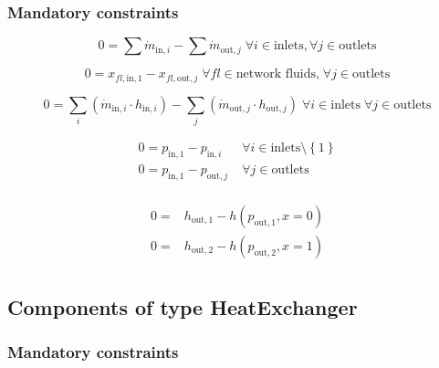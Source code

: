 \subsubsection{Mandatory constraints}

\begin{equation}
\label{eq:Drum_mass_flow_constraints}
0 =\sum\dot{m}_{\mathrm{in},i}-\sum\dot{m}_{\mathrm{out},j}\;\forall i \in \text{inlets}, \forall j \in \text{outlets}
\end{equation}

\begin{equation}
\label{eq:Drum_fluid_constraints}
0 = x_{fl\mathrm{,in,1}} - x_{fl\mathrm{,out,}j}\; \forall fl \in \text{network fluids,} \; \forall j \in\text{outlets}
\end{equation}

\begin{equation}
\label{eq:Drum_energy_balance_constraints}
0=\sum_i\left(\dot{m}_{\mathrm{in,}i}\cdot h_{\mathrm{in,}i}\right) - \sum_j \left(\dot{m}_{\mathrm{out,}j} \cdot h_{\mathrm{out,}j} \right) \; \forall i \in \text{inlets} \;\forall j \in \text{outlets}
\end{equation}

\begin{equation}
\label{eq:Drum_pressure_constraints}
\begin{split}
0 = p_\mathrm{in,1} - p_{\mathrm{in,}i} & \; \forall i \in \text{inlets} \setminus \left\lbrace 1\right\rbrace\\
0 = p_\mathrm{in,1} - p_{\mathrm{out,}j} & \; \forall j \in \text{outlets}\\
\end{split}
\end{equation}

\begin{equation}
\label{eq:Drum_outlet_constraints}
\begin{split}
0 =&h_\mathrm{out,1} -h\left(p_\mathrm{out,1}, x=0\right)\\0 =&h_\mathrm{out,2} -h\left(p_\mathrm{out,2}, x=1\right)\\\end{split}
\end{equation}


\subsection{Components of type HeatExchanger}

\subsubsection{Mandatory constraints}

